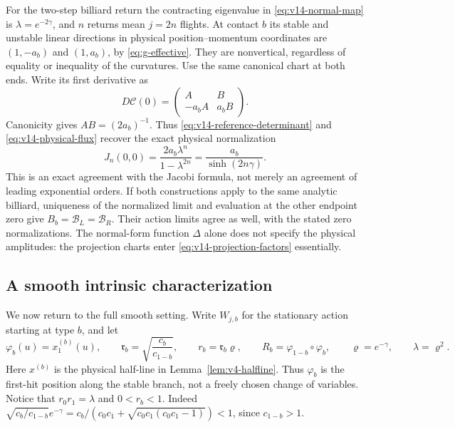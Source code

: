 For the two-step billiard return the contracting eigenvalue in
\eqref{eq:v14-normal-map} is $\lambda=e^{-2\gamma}$, and $n$
returns mean $j=2n$ flights. At contact $b$ its stable and unstable
linear directions in physical position--momentum coordinates are
$(1,-a_b)$ and $(1,a_b)$, by \eqref{eq:g-effective}. They are
nonvertical, regardless of equality or inequality of the curvatures.
Use the same canonical chart at both ends. Write its first derivative
as
\[
 D\mathcal C(0)=
 \begin{pmatrix}A&B\\-a_bA&a_bB\end{pmatrix}.
\]
Canonicity gives $AB=(2a_b)^{-1}$. Thus
\eqref{eq:v14-reference-determinant} and \eqref{eq:v14-physical-flux}
recover the exact physical normalization
\begin{equation}\label{eq:v14-csch-normalization}
 J_n(0,0)=\frac{2a_b\lambda^n}{1-\lambda^{2n}}
                        =\frac{a_b}{\sinh(2n\gamma)}.
\end{equation}
This is an exact agreement with the Jacobi formula, not merely an
agreement of leading exponential orders. If both constructions apply
to the same analytic billiard, uniqueness of the normalized limit and
evaluation at the other endpoint zero give
$B_b=\mathcal B_L=\mathcal B_R$. Their action limits agree as well,
with the stated zero normalizations. The normal-form function $\Delta$
alone does not specify the physical amplitudes: the projection charts
enter \eqref{eq:v14-projection-factors} essentially.



\subsection{A smooth intrinsic characterization}
We now return to the full smooth setting. Write $W_{j,b}$ for the
stationary action starting at type $b$, and let
\[
 \varphi_b(u)=x_1^{(b)}(u),\qquad
 \mathfrak r_b=\sqrt{\frac{c_b}{c_{1-b}}},\qquad
 r_b=\mathfrak r_b\varrho,\qquad
 R_b=\varphi_{1-b}\circ\varphi_b,\qquad
 \varrho=e^{-\gamma},\qquad \lambda=\varrho^2.
\]
Here $x^{(b)}$ is the physical half-line in
Lemma~\ref{lem:v4-halfline}. Thus $\varphi_b$ is the first-hit
position along the stable branch, not a freely chosen change of
variables. Notice that $r_0r_1=\lambda$ and $0<r_b<1$.
Indeed $\sqrt{c_b/c_{1-b}}e^{-\gamma}
=c_b/(c_0c_1+\sqrt{c_0c_1(c_0c_1-1)})<1$, since $c_{1-b}>1$.

